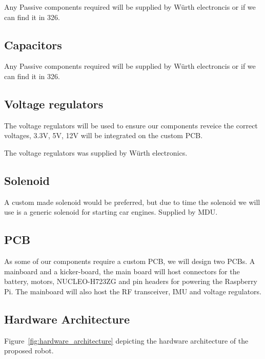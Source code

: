 \documentclass[a4paper,12pt]{article}
\begin{document}
  Any Passive components required will be supplied by Würth electroncis
  or if we can find it in 326.

  \subsection*{Capacitors}

  Any Passive components required will be supplied by Würth electroncis
  or if we can find it in 326.

  \subsection*{Voltage regulators}

  The voltage regulators will be used to ensure our components reveice
  the correct voltages, 3.3V, 5V, 12V will be integrated on the custom
  PCB.

  The voltage regulators was supplied by Würth electronics.

  \subsection*{Solenoid}

  A custom made solenoid would be preferred, but due to time the
  solenoid we will use is a generic solenoid for starting car engines.
  Supplied by MDU.

  \subsection*{PCB}

  As some of our components require a custom PCB, we will design two
  PCBs. A mainboard and a kicker-board, the main board will host
  connectors for the battery, motors, NUCLEO-H723ZG and pin headers for
  powering the Raspberry Pi. The mainboard will also host the RF
  transceiver, IMU and voltage regulators.

  \subsection*{Hardware Architecture}

  Figure\Figure~\ref{fig:hardware_architecture} depicting the hardware
  architecture of the proposed robot.
\end{document}

